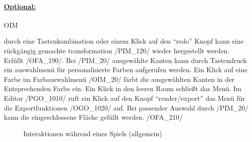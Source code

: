 %


\paragraph*{\underline{Optional:}}

\begin{ids}{\gls{OIM}}

	\id[10] durch eine Tastenkombination oder einem Klick auf den "`redo"' Knopf kann eine rückgängig gemachte transformation /PIM\_120/ wieder hergestellt werden. Erfüllt /OFA\_190/.
	\id[20] Bei /PIM\_20/ ausgewählte Kanten kann durch Tastendruck ein auswahlmenü für personalisierte Farben aufgerufen werden.
	\id[30] Ein Klick auf eine Farbe im Farbauswahlmenü /OIM\_20/ färbt die ausgewählten Kanten in der Entsprechenden Farbe ein. Ein Klick in den leeren Raum schließt das Menü.
	\id[40] Im Editor /PGO\_1010/ ruft ein Klick auf den Knopf "`render/export"' das Menü für die Exportfunktionen /OGO\_1020/ auf.
	\id[50] Bei passender Auswahl durch /PIM\_20/ kann die eingeschlossene Fläche gefüllt werden. /OFA\_210/ 

\end{ids}



\begin{landscape}

	\begin{figure}[ht]
	  \centering
	  
	  \caption{Interaktionen während eines Spiels (allgemein)}
	\end{figure}

\end{landscape}

\clearpage
